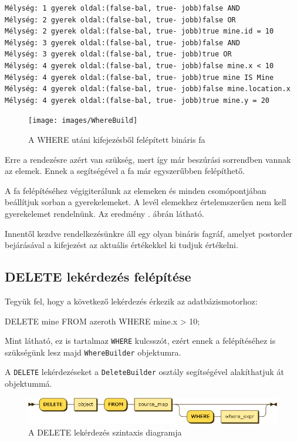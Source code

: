 \begin{verbatim}
Mélység: 1 gyerek oldal:(false-bal, true- jobb)false AND
Mélység: 2 gyerek oldal:(false-bal, true- jobb)false OR
Mélység: 2 gyerek oldal:(false-bal, true- jobb)true mine.id = 10
Mélység: 3 gyerek oldal:(false-bal, true- jobb)false AND
Mélység: 3 gyerek oldal:(false-bal, true- jobb)true OR
Mélység: 4 gyerek oldal:(false-bal, true- jobb)false mine.x < 10
Mélység: 4 gyerek oldal:(false-bal, true- jobb)true mine IS Mine
Mélység: 4 gyerek oldal:(false-bal, true- jobb)false mine.location.x
Mélység: 4 gyerek oldal:(false-bal, true- jobb)true mine.y = 20
\end{verbatim}

\begin{figure}[htb]
	\begin{center}
		\texttt{[image: images/WhereBuild]}
		\caption{A WHERE utáni kifejezésből felépített bináris fa}
		\label{fig:wherePostorderBuilder}
	\end{center}
\end{figure}


Erre a rendezésre azért van szükség, mert így már beszúrási sorrendben vannak az elemek. Ennek a segítségével a fa már egyszerűbben felépíthető.

A fa felépítéséhez végigiterálunk az elemeken és minden csomópontjában beállítjuk sorban a gyerekelemeket. A levél elemekhez értelemszerűen nem kell gyerekelemet rendelnünk. Az eredmény . ábrán látható.

Innentől kezdve rendelkezésünkre áll egy olyan bináris fagráf, amelyet postorder bejárásával a kifejezést az aktuális értékekkel ki tudjuk értékelni.

\subsection{DELETE lekérdezés felépítése}

Tegyük fel, hogy a következő lekérdezés érkezik az adatbázismotorhoz:
\begin{sql}
DELETE mine FROM azeroth WHERE mine.x > 10;
\end{sql}
Mint látható, ez is tartalmaz \texttt{WHERE} kulcsszót, ezért ennek a felépítéséhez is szükségünk lesz majd \texttt{WhereBuilder} objektumra.

A \texttt{DELETE} lekérdezéseket a \texttt{DeleteBuilder} osztály segítségével alakíthatjuk át objektummá.

\begin{figure}[htb]
	\begin{center}
		\includegraphics[scale=0.65]{images/delete_expr}
		\caption{A DELETE lekérdezés szintaxis diagramja}
		\label{fig:deleteSytnax}
	\end{center}
\end{figure}

